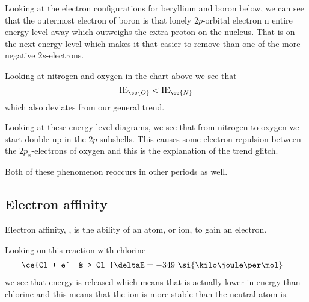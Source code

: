 \documentclass[../mit-general-chemistry.tex]{subfiles}
\begin{document}
Looking at the electron configurations for beryllium and boron below,
we can see that the outermost electron of boron is that lonely
$2p$-orbital electron n entire energy level away which outweighs the
extra proton on the nucleus. That is on the next energy level which makes it
that easier to remove than one of the more negative $2s$-electrons.


Looking at nitrogen and oxygen in the chart above we see that
\begin{equation*}
  \text{IE}_{\ce{O}} < \text{IE}_{\ce{N}}
\end{equation*}
which also deviates from our general trend.

Looking at these energy level diagrams, we see that from nitrogen to
oxygen we start double up in the $2p$-subshells. This causes some
electron repulsion between the $2p_x$-electrons of oxygen and this is
the explanation of the trend glitch.

\begin{center}
  \begin{MOdiagram}[names,labels,labels-fs=\footnotesize]
    \EnergyAxis[title=$E$]
  \end{MOdiagram}
\end{center}



Both of these phenomenon reoccurs in other periods as well.







\subsection{Electron affinity}



Electron affinity, \Eea, is the ability of an atom, or ion, to gain an
electron.


Looking on this reaction with chlorine
\begin{align*}
  \ce{Cl + e^- &-> Cl-} & \deltaE = -349~\si{\kilo\joule\per\mol}
\end{align*}
we see that energy is released which means that  is actually
lower in energy than chlorine and this means that the ion is more
stable than the neutral atom is.
\end{document}

